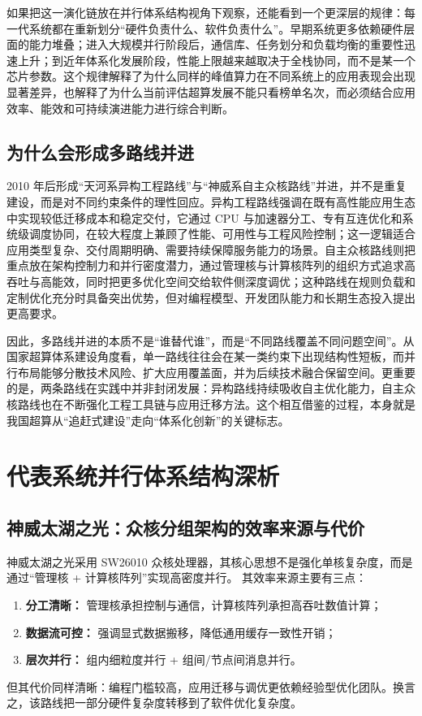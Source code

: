 \documentclass[12pt,a4paper]{article}
\begin{document}
如果把这一演化链放在并行体系结构视角下观察，还能看到一个更深层的规律：每一代系统都在重新划分“硬件负责什么、软件负责什么”。早期系统更多依赖硬件层面的能力堆叠；进入大规模并行阶段后，通信库、任务划分和负载均衡的重要性迅速上升；到近年体系化发展阶段，性能上限越来越取决于全栈协同，而不是某一个芯片参数。这个规律解释了为什么同样的峰值算力在不同系统上的应用表现会出现显著差异，也解释了为什么当前评估超算发展不能只看榜单名次，而必须结合应用效率、能效和可持续演进能力进行综合判断。

\subsection{为什么会形成多路线并进}
2010 年后形成“天河系异构工程路线”与“神威系自主众核路线”并进，并不是重复建设，而是对不同约束条件的理性回应。异构工程路线强调在既有高性能应用生态中实现较低迁移成本和稳定交付，它通过 CPU 与加速器分工、专有互连优化和系统级调度协同，在较大程度上兼顾了性能、可用性与工程风险控制；这一逻辑适合应用类型复杂、交付周期明确、需要持续保障服务能力的场景。自主众核路线则把重点放在架构控制力和并行密度潜力，通过管理核与计算核阵列的组织方式追求高吞吐与高能效，同时把更多优化空间交给软件侧深度调优；这种路线在规则负载和定制优化充分时具备突出优势，但对编程模型、开发团队能力和长期生态投入提出更高要求。

因此，多路线并进的本质不是“谁替代谁”，而是“不同路线覆盖不同问题空间”。从国家超算体系建设角度看，单一路线往往会在某一类约束下出现结构性短板，而并行布局能够分散技术风险、扩大应用覆盖面，并为后续技术融合保留空间。更重要的是，两条路线在实践中并非封闭发展：异构路线持续吸收自主优化能力，自主众核路线也在不断强化工程工具链与应用迁移方法。这个相互借鉴的过程，本身就是我国超算从“追赶式建设”走向“体系化创新”的关键标志。

\section{代表系统并行体系结构深析}
\subsection{神威太湖之光：众核分组架构的效率来源与代价}
神威太湖之光采用 SW26010 众核处理器，其核心思想不是强化单核复杂度，而是通过“管理核 + 计算核阵列”实现高密度并行\cite{top500-sunway,top500-2016-highlights}。  
其效率来源主要有三点：
\begin{enumerate}[leftmargin=2.5em]
  \item \textbf{分工清晰：} 管理核承担控制与通信，计算核阵列承担高吞吐数值计算；
  \item \textbf{数据流可控：} 强调显式数据搬移，降低通用缓存一致性开销；
  \item \textbf{层次并行：} 组内细粒度并行 + 组间/节点间消息并行。
\end{enumerate}
但其代价同样清晰：编程门槛较高，应用迁移与调优更依赖经验型优化团队。换言之，该路线把一部分硬件复杂度转移到了软件优化复杂度。
\end{document}
